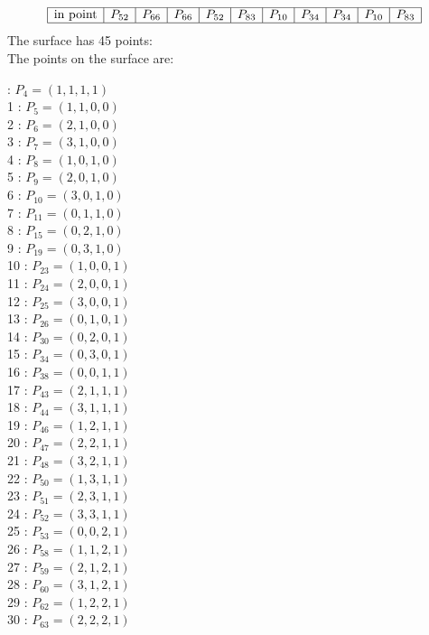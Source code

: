 \documentclass{article}
\begin{document}
{$$\begin{array}{|r*{10}{|c}|}
\hline
\mbox{in point}  & P_{52} & P_{66} & P_{66} & P_{52} & P_{83} & P_{10} & P_{34} & P_{34} & P_{10} & P_{83}\\
\hline
\end{array}
$$
The surface has 45 points:\\
The points on the surface are:\\
\begin{multicols}{3}
 : $P_{4}=( 1, 1, 1, 1 )$\\
1 : $P_{5}=( 1, 1, 0, 0 )$\\
2 : $P_{6}=( 2, 1, 0, 0 )$\\
3 : $P_{7}=( 3, 1, 0, 0 )$\\
4 : $P_{8}=( 1, 0, 1, 0 )$\\
5 : $P_{9}=( 2, 0, 1, 0 )$\\
6 : $P_{10}=( 3, 0, 1, 0 )$\\
7 : $P_{11}=( 0, 1, 1, 0 )$\\
8 : $P_{15}=( 0, 2, 1, 0 )$\\
9 : $P_{19}=( 0, 3, 1, 0 )$\\
10 : $P_{23}=( 1, 0, 0, 1 )$\\
11 : $P_{24}=( 2, 0, 0, 1 )$\\
12 : $P_{25}=( 3, 0, 0, 1 )$\\
13 : $P_{26}=( 0, 1, 0, 1 )$\\
14 : $P_{30}=( 0, 2, 0, 1 )$\\
15 : $P_{34}=( 0, 3, 0, 1 )$\\
16 : $P_{38}=( 0, 0, 1, 1 )$\\
17 : $P_{43}=( 2, 1, 1, 1 )$\\
18 : $P_{44}=( 3, 1, 1, 1 )$\\
19 : $P_{46}=( 1, 2, 1, 1 )$\\
20 : $P_{47}=( 2, 2, 1, 1 )$\\
21 : $P_{48}=( 3, 2, 1, 1 )$\\
22 : $P_{50}=( 1, 3, 1, 1 )$\\
23 : $P_{51}=( 2, 3, 1, 1 )$\\
24 : $P_{52}=( 3, 3, 1, 1 )$\\
25 : $P_{53}=( 0, 0, 2, 1 )$\\
26 : $P_{58}=( 1, 1, 2, 1 )$\\
27 : $P_{59}=( 2, 1, 2, 1 )$\\
28 : $P_{60}=( 3, 1, 2, 1 )$\\
29 : $P_{62}=( 1, 2, 2, 1 )$\\
30 : $P_{63}=( 2, 2, 2, 1 )$\\

\end{multicols}}
\end{document}
